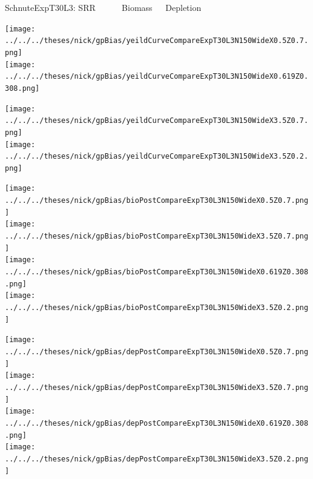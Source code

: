 \documentclass[ xcolor = pdftex, dvipsnames, table ]{beamer}
\begin{document}
%
\begin{frame}{SchnuteExpT30L3: SRR $~~~~~~~~~~~$ Biomass $~~~~$ Depletion}
$~$
\hspace*{-1.25cm}
\begin{minipage}[h!]{0.25\textwidth}
\texttt{[image: ../../../theses/nick/gpBias/yeildCurveCompareExpT30L3N150WideX0.5Z0.7.png]}\\
\texttt{[image: ../../../theses/nick/gpBias/yeildCurveCompareExpT30L3N150WideX0.619Z0.308.png]}
\end{minipage}
\begin{minipage}[h!]{0.25\textwidth}
\hspace*{0.45cm}
\texttt{[image: ../../../theses/nick/gpBias/yeildCurveCompareExpT30L3N150WideX3.5Z0.7.png]}\\
\hspace*{0.45cm}
\texttt{[image: ../../../theses/nick/gpBias/yeildCurveCompareExpT30L3N150WideX3.5Z0.2.png]}
\end{minipage}
\begin{minipage}[h!]{0.25\textwidth}
\vspace{-0.1cm}
\hspace*{1.5cm}
\texttt{[image: ../../../theses/nick/gpBias/bioPostCompareExpT30L3N150WideX0.5Z0.7.png]}\\
\hspace*{1.5cm}
\texttt{[image: ../../../theses/nick/gpBias/bioPostCompareExpT30L3N150WideX3.5Z0.7.png]}\\
\hspace*{1.5cm}
\texttt{[image: ../../../theses/nick/gpBias/bioPostCompareExpT30L3N150WideX0.619Z0.308.png]}\\
\hspace*{1.5cm}
\texttt{[image: ../../../theses/nick/gpBias/bioPostCompareExpT30L3N150WideX3.5Z0.2.png]}
\end{minipage}
\begin{minipage}[h!]{0.25\textwidth}
\vspace{-0.1cm}
\hspace*{1.5cm}
\texttt{[image: ../../../theses/nick/gpBias/depPostCompareExpT30L3N150WideX0.5Z0.7.png]}\\
\hspace*{1.5cm}
\texttt{[image: ../../../theses/nick/gpBias/depPostCompareExpT30L3N150WideX3.5Z0.7.png]}\\
\hspace*{1.5cm}
\texttt{[image: ../../../theses/nick/gpBias/depPostCompareExpT30L3N150WideX0.619Z0.308.png]}\\
\hspace*{1.5cm}
\texttt{[image: ../../../theses/nick/gpBias/depPostCompareExpT30L3N150WideX3.5Z0.2.png]}
\end{minipage}
\end{frame}
\end{document}
